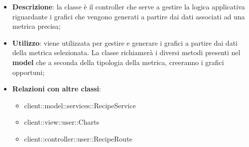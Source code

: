 			\begin{itemize}
				\item \textbf{Descrizione}: la classe è il controller che serve a gestire la logica applicativa riguardante i grafici che vengono generati a partire dai dati associati ad una metrica precisa;
				\item \textbf{Utilizzo}: viene utilizzata per gestire e generare i grafici a partire dai dati della metrica selezionata. La classe richiamerà i diversi metodi presenti nel \textbf{model} che a seconda della tipologia della metrica, creeranno i grafici opportuni;
				\item \textbf{Relazioni con altre classi}:
					\begin{itemize}
						\item client::model::services::RecipeService
						\item client::view::user::Charts
						\item client::controller::user::RecipeRoute
					\end{itemize}


\end{itemize}
